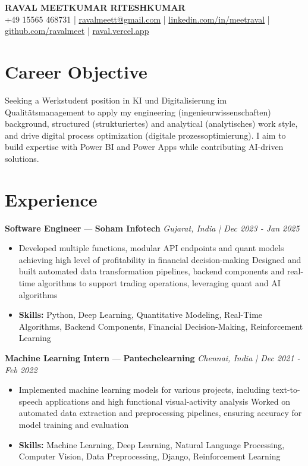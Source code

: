 \documentclass[a4paper,10pt]{article}
\begin{document}
\begin{center}
  {\Large\bfseries RAVAL MEETKUMAR RITESHKUMAR}\\[2pt]
  {\small +49 15565 468731 \;|\; \href{mailto:ravalmeett@gmail.com}{ravalmeett@gmail.com} \;|\; \href{https://www.linkedin.com/in/meetraval/}{linkedin.com/in/meetraval} \;|\; \href{https://github.com/ravalmeet}{github.com/ravalmeet} \;|\; \href{https://raval.vercel.app/}{raval.vercel.app}}
\end{center}
\vspace{-3pt}

\section*{Career Objective}
Seeking a Werkstudent position in KI und Digitalisierung im Qualitätsmanagement to apply my engineering (ingenieurwissenschaften) background, structured (strukturiertes) and analytical (analytisches) work style, and drive digital process optimization (digitale prozessoptimierung). I aim to build expertise with Power BI and Power Apps while contributing AI-driven solutions.\par

\section*{Experience}
\textbf{Software Engineer} — \textbf{Soham Infotech} \hfill \textit{Gujarat, India \;|\; Dec 2023 - Jan 2025}\par
\vspace{1pt}
\begin{itemize}
  \item Developed multiple functions, modular API endpoints and quant models achieving high level of profitability in financial decision-making Designed and built automated data transformation pipelines, backend components and real-time algorithms to support trading operations, leveraging quant and AI algorithms
  \item \textbf{Skills:} Python, Deep Learning, Quantitative Modeling, Real-Time Algorithms, Backend Components, Financial Decision-Making, Reinforcement Learning
\end{itemize}
\vspace{3pt}
\textbf{Machine Learning Intern} — \textbf{Pantechelearning} \hfill \textit{Chennai, India \;|\; Dec 2021 - Feb 2022}\par
\vspace{1pt}
\begin{itemize}
  \item Implemented machine learning models for various projects, including text-to-speech applications and high functional visual-activity analysis Worked on automated data extraction and preprocessing pipelines, ensuring accuracy for model training and evaluation
  \item \textbf{Skills:} Machine Learning, Deep Learning, Natural Language Processing, Computer Vision, Data Preprocessing, Django, Reinforcement Learning
\end{itemize}
\end{document}
